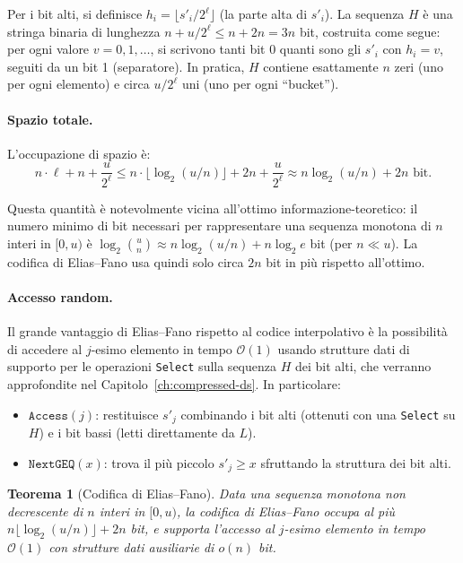 \documentclass[12pt, a4paper, oneside]{book}
\theoremstyle{plain}
\newtheorem{teorema}{Teorema}[chapter]
\theoremstyle{definition}
\theoremstyle{remark}
\newcommand{\OO}[1]{\mathcal{O}\!\left(#1\right)}
\begin{document}
Per i bit alti, si definisce $h_i = \lfloor s'_i / 2^\ell \rfloor$ (la parte alta di $s'_i$). La sequenza $H$ è una stringa binaria di lunghezza $n + u/2^\ell \leq n + 2n = 3n$ bit, costruita come segue: per ogni valore $v = 0, 1, \ldots$, si scrivono tanti bit 0 quanti sono gli $s'_i$ con $h_i = v$, seguiti da un bit 1 (separatore). In pratica, $H$ contiene esattamente $n$ zeri (uno per ogni elemento) e circa $u/2^\ell$ uni (uno per ogni ``bucket'').

\paragraph{Spazio totale.}
L'occupazione di spazio è:
\[
n \cdot \ell + n + \frac{u}{2^\ell} \leq n \cdot \lfloor \log_2(u/n) \rfloor + 2n + \frac{u}{2^\ell} \approx n \log_2(u/n) + 2n \text{ bit}.
\]

Questa quantità è notevolmente vicina all'ottimo informazione-teoretico: il numero minimo di bit necessari per rappresentare una sequenza monotona di $n$ interi in $[0,u)$ è $\log_2 \binom{u}{n} \approx n \log_2(u/n) + n \log_2 e$ bit (per $n \ll u$). La codifica di Elias--Fano usa quindi solo circa $2n$ bit in più rispetto all'ottimo.

\paragraph{Accesso random.}
Il grande vantaggio di Elias--Fano rispetto al codice interpolativo è la possibilità di accedere al $j$-esimo elemento in tempo $\OO{1}$ usando strutture dati di supporto per le operazioni \texttt{Select} sulla sequenza $H$ dei bit alti, che verranno approfondite nel Capitolo~\ref{ch:compressed-ds}. In particolare:
\begin{itemize}
  \item $\mathtt{Access}(j)$: restituisce $s'_j$ combinando i bit alti (ottenuti con una \texttt{Select} su $H$) e i bit bassi (letti direttamente da $L$).
  \item $\mathtt{NextGEQ}(x)$: trova il più piccolo $s'_j \geq x$ sfruttando la struttura dei bit alti.
\end{itemize}

\begin{teorema}[Codifica di Elias--Fano]
\label{thm:elias-fano}
Data una sequenza monotona non decrescente di $n$ interi in $[0, u)$, la codifica di Elias--Fano occupa al più $n\lfloor \log_2(u/n) \rfloor + 2n$ bit, e supporta l'accesso al $j$-esimo elemento in tempo $\OO{1}$ con strutture dati ausiliarie di $o(n)$ bit.
\end{teorema}
\end{document}
